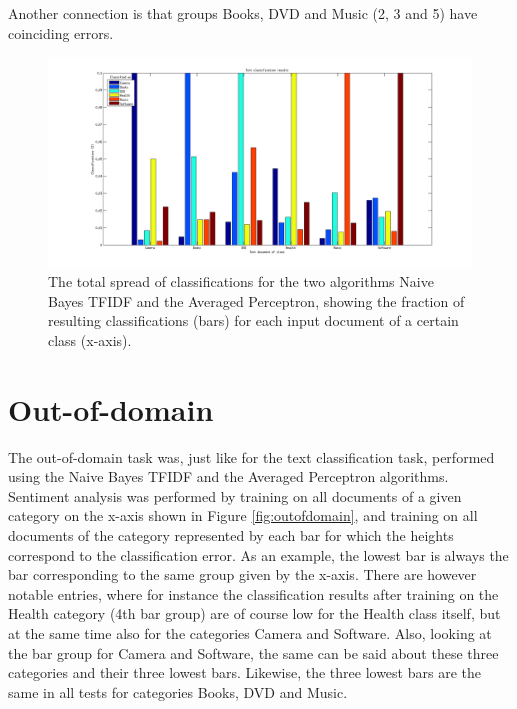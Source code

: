 Another connection is that groups Books, DVD and Music (2, 3 and 5) have coinciding errors.

\begin{figure}[h!]
	\centering
	\includegraphics[width=1\linewidth]{../Plottar/text_categorization.png}
	\caption{The total spread of classifications for the two algorithms Naive Bayes TFIDF and the Averaged Perceptron, showing the fraction of resulting classifications (bars) for each input document of a certain class (x-axis).}
	\label{fig:textcategorization}
\end{figure}  



\section{Out-of-domain}

The out-of-domain task was, just like for the text classification task, performed using the Naive Bayes TFIDF and the Averaged Perceptron algorithms. Sentiment analysis was performed by training on all documents of a given category on the x-axis shown in Figure \ref{fig:outofdomain}, and training on all documents of the category represented by each bar for which the heights correspond to the classification error. As an example, the lowest bar is always the bar corresponding to the same group given by the x-axis. There are however notable entries, where for instance the classification results after training on the Health category (4th bar group) are of course low for the Health class itself, but at the same time also for the categories Camera and Software. Also, looking at the bar group for Camera and Software, the same can be said about these three categories and their three lowest bars. Likewise, the three lowest bars are the same in all tests for categories Books, DVD and Music.

